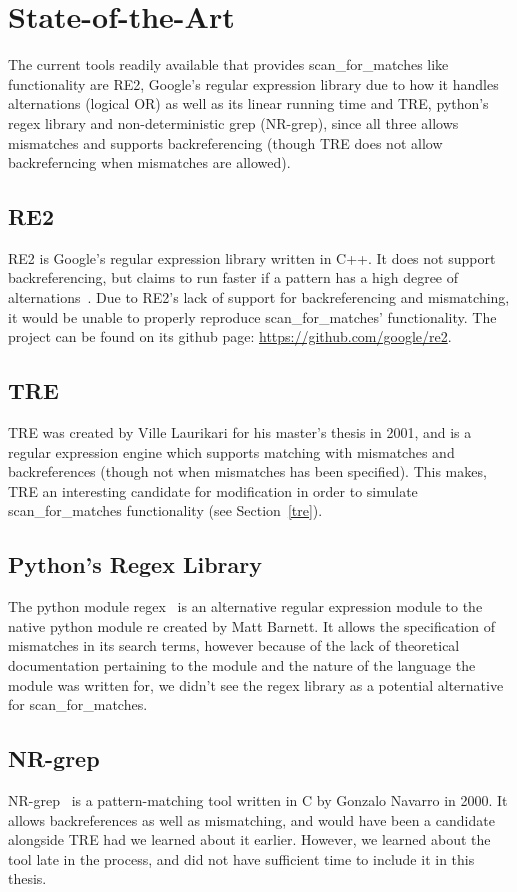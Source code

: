\section{State-of-the-Art}
The current tools readily available that provides scan\_for\_matches like 
functionality are RE2, Google's regular expression library due to 
how it handles alternations (logical OR) as well as its linear 
running time and TRE, python's regex library and non-deterministic grep 
(NR-grep), since all three allows mismatches and supports backreferencing 
(though TRE does not allow backreferncing when mismatches are allowed). 
 \subsection{RE2} %
 RE2 is Google's regular expression library written in C++. It does not 
 support backreferencing, but claims to run faster if a pattern has a high degree 
 of alternations~\cite{re2java}. Due to RE2's lack of support for backreferencing and mismatching, 
 it would be unable to properly reproduce scan\_for\_matches' functionality. 
 The project can be found on its github page: \url{https://github.com/google/re2}.
 \subsection{TRE} %
 TRE was created by Ville Laurikari for his master's thesis in 
 2001\cite{LaurikariComplex}, and is a regular expression engine which supports 
 matching with mismatches and backreferences (though not when mismatches has 
 been specified). This makes, TRE an interesting candidate for modification in 
 order to simulate scan\_for\_matches functionality (see Section~\ref{tre}).
 \subsection{Python's Regex Library} %
 The python module regex~\cite{pythonregex} is an alternative regular expression 
 module to the native python module re created by Matt Barnett. It allows the 
 specification of mismatches in its search terms, however because of the lack 
 of theoretical documentation pertaining to the module and the nature of 
 the language the module was written for, we didn't see the regex library as 
 a potential alternative for scan\_for\_matches. 
 \subsection{NR-grep}
 NR-grep~\cite{Navarro00nr-grep:a} is a pattern-matching tool written 
 in C by Gonzalo Navarro in 2000. It allows backreferences as well as mismatching, 
 and would have been a candidate alongside TRE had 
 we learned about it earlier. However, we learned about the tool 
 late in the process, and did not have sufficient time to include it in this thesis.
